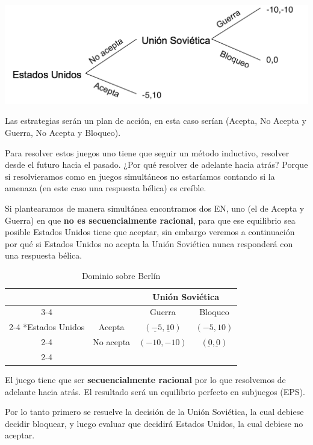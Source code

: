 \begin{center}
    \includegraphics[scale=0.5]{Figuras/juegos secuencia.png}  
\end{center}
Las estrategias serán un plan de acción, en esta caso serían (Acepta, No Acepta y Guerra, No Acepta y Bloqueo).

Para resolver estos juegos uno tiene que seguir un método inductivo, resolver desde el futuro hacia el pasado. ¿Por qué resolver de adelante hacia atrás? Porque si resolvieramos como en juegos simultáneos no estaríamos contando si la amenaza (en este caso una respuesta bélica) es creíble. 

Si plantearamos de manera simultánea encontramos dos EN, uno (el de Acepta y Guerra) en que \textbf{no es secuencialmente racional}, para que ese equilibrio sea posible Estados Unidos tiene que aceptar, sin embargo veremos a continuación por qué si Estados Unidos no acepta la Unión Soviética nunca responderá con una respuesta bélica.

\begin{table}[!htbp]
    \centering
    \caption{Dominio sobre Berlín}
    \setlength{\extrarowheight}{2pt}
    \begin{tabular}{*{4}{c|}}
      \multicolumn{2}{c}{} & \multicolumn{2}{c}{Unión Soviética}\\\cline{3-4}
      \multicolumn{1}{c}{} &  & Guerra & Bloqueo \\\cline{2-4}
      \multirow{2}*{Estados Unidos}  & Acepta & $(\underbar{-5},\underbar{10})$ & $(-5,10)$ \\\cline{2-4}
      & No acepta & $(-10,-10)$ & $(\underbar{0},\underbar{0})$ \\\cline{2-4}
    \end{tabular}
  \end{table}

El juego tiene que ser \textbf{secuencialmente racional} por lo que resolvemos de adelante hacia atrás. El resultado será un equilibrio perfecto en subjuegos (EPS).

Por lo tanto primero se resuelve la decisión de la Unión Soviética, la cual debiese decidir bloquear, y luego evaluar que decidirá Estados Unidos, la cual debiese no aceptar. 

